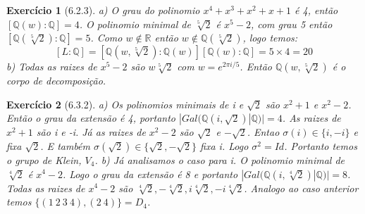 \documentclass{article}
\newtheorem*{ex}{Exercício}
\begin{document}
\begin{ex}[6.2.3]
    a) O grau do polinomio $x^4 + x^3 + x^2 + x + 1$ é 4, então $[\mathbb{Q}(w): \mathbb{Q}] = 4$.
    O polinomio minimal de $\sqrt[5]{2}$ é $x^5 -2$, com grau 5 então $[\mathbb{Q}(\sqrt[5]{2}): \mathbb{Q}] = 5$.
    Como $w \notin \mathbb{R}$ então $w \notin \mathbb{Q}(\sqrt[5]{2})$, logo temos:
    \[[L : \mathbb{Q}] = [\mathbb{Q}(w, \sqrt[5]{2}): \mathbb{Q}(w)][\mathbb{Q}(w): \mathbb{Q}] = 5 \times 4 = 20\]
    b) Todas as raizes de $x^5 -2$ são $w\sqrt[5]{2}$ com $w = e^{2 \pi i / 5}$.
    Então $\mathbb{Q}(w, \sqrt[5]{2})$ é o corpo de decomposição.
\end{ex}

\begin{ex}[6.3.2]
    a) Os polinomios minimais de i e $\sqrt{2}$ são $x^2 + 1$ e $x^2 - 2$.
    Então o grau da extensão é 4, portanto $|Gal(\mathbb{Q}(i, \sqrt{2}) | \mathbb{Q})| = 4$.
    As raizes de $x^2 + 1$ são i e -i. 
    Já as raizes de $x^2 -2$ são $\sqrt{2}$ e $-\sqrt{2}$.
    Entao $\sigma(i) \in \{i, -i\}$ e fixa $\sqrt{2}$.
    E também $\sigma(\sqrt{2}) \in \{\sqrt{2}, -\sqrt{2}\}$ fixa i.
    Logo $\sigma^2 = Id$.
    Portanto temos o grupo de Klein, $V_4$.
    b) Já analisamos o caso para i. O polinomio minimal de $\sqrt[4]{2}$ é $x^4-2$. 
    Logo o grau da extensão é 8 e portanto $|Gal(\mathbb{Q}(i, \sqrt[4]{2}) | \mathbb{Q})| = 8$.
    Todas as raizes de $x^4-2$ são $\sqrt[4]{2}, -\sqrt[4]{2}, i\sqrt[4]{2}, -i\sqrt[4]{2}$.
    Analogo ao caso anterior temos $\{(1 \: 2 \: 3 \: 4), (2 \: 4)\} = D_4$.
\end{ex}
\end{document}
